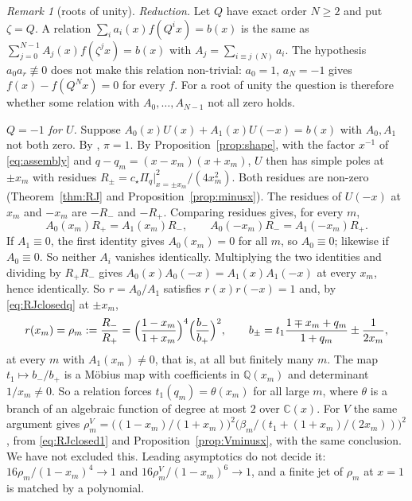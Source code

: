 \documentclass[11pt]{article}
\theoremstyle{plain}
\theoremstyle{definition}
\theoremstyle{remark}
\newtheorem{remark}[theorem]{Remark}
\newcommand{\Q}{\mathbb{Q}}
\newcommand{\C}{\mathbb{C}}
\theoremstyle{plain}\newtheorem*{maintheorem}{Main Theorem}
\begin{document}
\begin{remark}[roots of unity]\label{rem:rootunity}
\emph{Reduction.} Let $Q$ have exact order $N\ge2$ and put $\zeta=Q$. A relation
$\sum_ia_i(x)f(Q^ix)=b(x)$ is the same as
$\sum_{j=0}^{N-1}A_j(x)f(\zeta^jx)=b(x)$ with $A_j=\sum_{i\equiv j\ (N)}a_i$. The hypothesis
$a_0a_r\not\equiv0$ does not make this relation non-trivial: $a_0=1$, $a_N=-1$ gives
$f(x)-f(Q^Nx)=0$ for every $f$. For a root of unity the question is therefore whether some
relation with $A_0,\dots,A_{N-1}$ not all zero holds.

\emph{$Q=-1$ for $U$.} Suppose $A_0(x)U(x)+A_1(x)U(-x)=b(x)$ with $A_0,A_1$ not both zero. By
{\cite[Proposition \textup{prop:simplepoles}]{Bonfioli2026bB}}, $\pi=1$. By
Proposition~\ref{prop:shape}, with the factor $x^{-1}$ of \eqref{eq:assembly} and
$q-q_m=(x-x_m)(x+x_m)$, $U$ then has simple poles at $\pm x_m$ with residues
$R_\pm=c_\star\Pi_q|_{x=\pm x_m}^2/(4x_m^2)$. Both residues are non-zero
(Theorem~\ref{thm:RJ} and Proposition~\ref{prop:minusx}). The residues of $U(-x)$ at $x_m$ and
$-x_m$ are $-R_-$ and $-R_+$. Comparing residues gives, for every $m$,
\[
   A_0(x_m)R_+=A_1(x_m)R_-,\qquad A_0(-x_m)R_-=A_1(-x_m)R_+ .
\]
If $A_1\equiv0$, the first identity gives $A_0(x_m)=0$ for all $m$, so $A_0\equiv0$; likewise if
$A_0\equiv0$. So neither $A_i$ vanishes identically. Multiplying the two identities and dividing
by $R_+R_-$ gives $A_0(x)A_0(-x)=A_1(x)A_1(-x)$ at every $x_m$, hence identically. So $r=A_0/A_1$
satisfies $r(x)r(-x)=1$ and, by \eqref{eq:RJclosedq} at $\pm x_m$,
\begin{equation}\label{eq:rhom}
   r(x_m)=\rho_m:=\frac{R_-}{R_+}
   =\Bigl(\frac{1-x_m}{1+x_m}\Bigr)^{4}\Bigl(\frac{b_-}{b_+}\Bigr)^{2},\qquad
   b_\pm=t_1\frac{1\mp x_m+q_m}{1+q_m}\pm\frac1{2x_m},
\end{equation}
at every $m$ with $A_1(x_m)\ne0$, that is, at all but finitely many $m$. The map
$t_1\mapsto b_-/b_+$ is a M\"obius map with coefficients in $\Q(x_m)$ and determinant $1/x_m\ne0$.
So a relation forces $t_1(q_m)=\theta(x_m)$ for all large $m$, where $\theta$ is a branch of an
algebraic function of degree at most $2$ over $\C(x)$. For $V$ the same argument gives
$\rho^V_m=\bigl((1-x_m)/(1+x_m)\bigr)^2\bigl(\beta_m/(t_1+(1+x_m)/(2x_m))\bigr)^2$, from
\eqref{eq:RJclosed1} and Proposition~\ref{prop:Vminusx}, with the same conclusion. We have not
excluded this. Leading asymptotics do not decide it: $16\rho_m/(1-x_m)^4\to1$ and
$16\rho^V_m/(1-x_m)^6\to1$, and a finite jet of $\rho_m$ at $x=1$ is matched by a polynomial.


\end{remark}
\end{document}
